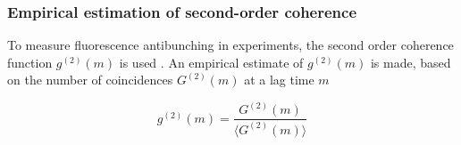



\subsubsection{Empirical estimation of second-order coherence}

To measure fluorescence antibunching in experiments, the second order coherence function $g^{(2)}(m)$ is used \parencite{Israel2017}. An empirical estimate of $g^{(2)}(m)$ is made, based on the number of coincidences $G^{(2)}(m)$ at a lag time $m$

\begin{equation}
g^{(2)}(m)=\frac{G^{(2)}(m)}{\langle G^{(2)}(m)\rangle }
\end{equation}


